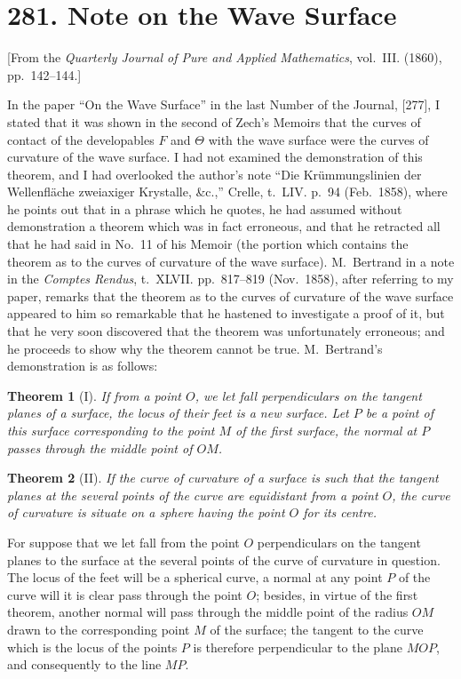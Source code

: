 \documentclass[11pt,a4paper]{article}
\theoremstyle{plain}
\newtheorem{theorem}{Theorem}
\begin{document}
\section*{281. Note on the Wave Surface}
\label{sec:281}

[From the \textit{Quarterly Journal of Pure and Applied Mathematics}, vol.~III. (1860), pp.~142--144.]

In the paper ``On the Wave Surface'' in the last Number of the Journal, [277], I stated that it was shown in the second of Zech's Memoirs that the curves of contact of the developables $F$ and $\Theta$ with the wave surface were the curves of curvature of the wave surface. I had not examined the demonstration of this theorem, and I had overlooked the author's note ``Die Kr\"{u}mmungslinien der Wellenfl\"{a}che zweiaxiger Krystalle, \&c.,'' Crelle, t.~LIV. p.~94 (Feb.~1858), where he points out that in a phrase which he quotes, he had assumed without demonstration a theorem which was in fact erroneous, and that he retracted all that he had said in No.~11 of his Memoir (the portion which contains the theorem as to the curves of curvature of the wave surface). M.~Bertrand in a note in the \textit{Comptes Rendus}, t.~XLVII. pp.~817--819 (Nov.~1858), after referring to my paper, remarks that the theorem as to the curves of curvature of the wave surface appeared to him so remarkable that he hastened to investigate a proof of it, but that he very soon discovered that the theorem was unfortunately erroneous; and he proceeds to show why the theorem cannot be true. M.~Bertrand's demonstration is as follows:

\begin{theorem}[I]
If from a point $O$, we let fall perpendiculars on the tangent planes of a surface, the locus of their feet is a new surface. Let $P$ be a point of this surface corresponding to the point $M$ of the first surface, the normal at $P$ passes through the middle point of $OM$.
\end{theorem}

\begin{theorem}[II]
If the curve of curvature of a surface is such that the tangent planes at the several points of the curve are equidistant from a point $O$, the curve of curvature is situate on a sphere having the point $O$ for its centre.
\end{theorem}

For suppose that we let fall from the point $O$ perpendiculars on the tangent planes to the surface at the several points of the curve of curvature in question. The locus of the feet will be a spherical curve, a normal at any point $P$ of the curve will it is clear pass through the point $O$; besides, in virtue of the first theorem, another normal will pass through the middle point of the radius $OM$ drawn to the corresponding point $M$ of the surface; the tangent to the curve which is the locus of the points $P$ is therefore perpendicular to the plane $MOP$, and consequently to the line $MP$.
\end{document}
